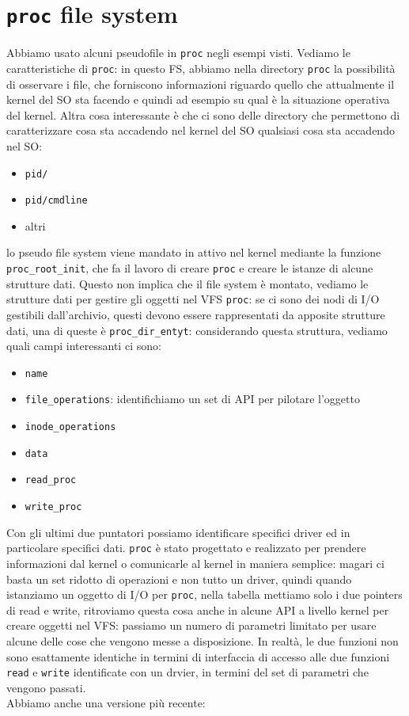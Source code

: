 \documentclass[12pt, oneside]{extbook}
\begin{document}
\section{\texttt{proc} file system}
Abbiamo usato alcuni pseudofile in \texttt{proc} negli esempi visti. Vediamo le caratteristiche di \texttt{proc}: in questo FS, abbiamo nella directory \texttt{proc} la possibilità di osservare i file, che forniscono informazioni riguardo quello che attualmente il kernel del SO sta facendo e quindi ad esempio su qual è la situazione operativa del kernel. Altra cosa interessante è che ci sono delle directory che permettono di caratterizzare cosa sta accadendo nel kernel del SO qualsiasi cosa sta accadendo nel SO:
\begin{itemize}
	\item \texttt{pid/}
	\item \texttt{pid/cmdline}
	\item altri
\end{itemize}
lo pseudo file system viene mandato in attivo nel kernel mediante la funzione \texttt{proc\_root\_init}, che fa il lavoro di creare \texttt{proc} e creare le istanze di alcune strutture dati. Questo non implica che il file system è montato, vediamo le strutture dati per gestire gli oggetti nel VFS \texttt{proc}: se ci sono dei nodi di I/O gestibili dall'archivio, questi devono essere rappresentati da apposite strutture dati, una di queste è \texttt{proc\_dir\_entyt}:
considerando questa struttura, vediamo quali campi interessanti ci sono:
\begin{itemize}
	\item \texttt{name}
	\item \texttt{file\_operations}: identifichiamo un set di API per pilotare l'oggetto
	\item \texttt{inode\_operations}
	\item \texttt{data}
	\item \texttt{read\_proc}
	\item \texttt{write\_proc}
\end{itemize}
Con gli ultimi due puntatori possiamo identificare specifici driver ed in particolare specifici dati. \texttt{proc} è stato progettato e realizzato per prendere informazioni dal kernel o comunicarle al kernel in maniera semplice: magari ci basta un set ridotto di operazioni e non tutto un driver, quindi quando istanziamo un oggetto di I/O per \texttt{proc}, nella tabella mettiamo solo i due pointers di read e write, ritroviamo questa cosa anche in alcune API a livello kernel per creare oggetti nel VFS: passiamo un numero di parametri limitato per usare alcune delle cose che vengono messe a disposizione. In realtà, le due funzioni non sono esattamente identiche in termini di interfaccia di accesso alle due funzioni \texttt{read} e \texttt{write} identificate con un drvier, in termini del set di parametri che vengono passati.\\Abbiamo anche una versione più recente:
\end{document}
